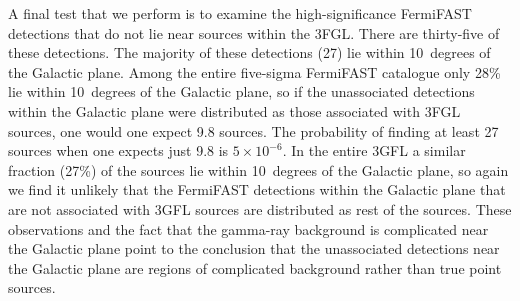 \documentclass[useAMS,usenatbib]{mn2e}
\begin{document}
A final test that we perform is to examine the high-significance
FermiFAST detections that do not lie near sources within the 3FGL.
There are thirty-five of these detections.  The majority of these
detections (27) lie within 10~degrees of the Galactic plane.  Among
the entire five-sigma FermiFAST catalogue only 28\% lie within
10~degrees of the Galactic plane, so if the unassociated detections
within the Galactic plane were distributed as those associated with
3FGL sources, one would one expect 9.8 sources.  The probability of
finding at least 27 sources when one expects just 9.8 is $5\times
10^{-6}$.  In the entire 3GFL a similar fraction (27\%) of the sources
lie within 10~degrees of the Galactic plane, so again we find it
unlikely that the FermiFAST detections within the Galactic plane that
are not associated with 3GFL sources are distributed as rest of the
sources.  These observations and the fact that the gamma-ray
background is complicated near the Galactic plane point to the
conclusion that the unassociated detections near the Galactic plane are
regions of complicated background rather than true point sources.
\end{document}
